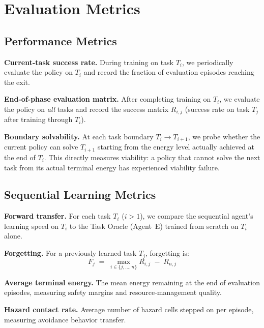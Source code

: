 \documentclass{article}
\begin{document}
\section{Evaluation Metrics}
\label{sec:metrics}

\subsection{Performance Metrics}

\textbf{Current-task success rate.} During training on task $T_i$, we
periodically evaluate the policy on $T_i$ and record the fraction of
evaluation episodes reaching the exit.

\textbf{End-of-phase evaluation matrix.} After completing training on
$T_i$, we evaluate the policy on \emph{all} tasks and record the success
matrix $R_{i,j}$ (success rate on task $T_j$ after training through $T_i$).

\textbf{Boundary solvability.} At each task boundary $T_i \to T_{i+1}$,
we probe whether the current policy can solve $T_{i+1}$ starting from
the energy level actually achieved at the end of $T_i$. This directly
measures viability: a policy that cannot solve the next task from its
actual terminal energy has experienced viability failure.

\subsection{Sequential Learning Metrics}

\textbf{Forward transfer.} For each task $T_i$ ($i > 1$), we compare the
sequential agent's learning speed on $T_i$ to the Task Oracle (Agent~E)
trained from scratch on $T_i$ alone.

\textbf{Forgetting.} For a previously learned task $T_j$, forgetting is:
\begin{equation}
  F_j \;=\; \max_{i \in \{j,\ldots,n\}} R_{i,j} \;-\; R_{n,j}
\end{equation}

\textbf{Average terminal energy.} The mean energy remaining at the end of
evaluation episodes, measuring safety margins and resource-management quality.

\textbf{Hazard contact rate.} Average number of hazard cells stepped on per
episode, measuring avoidance behavior transfer.
\end{document}
